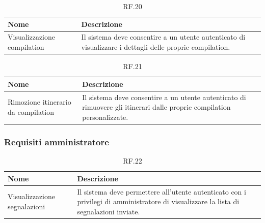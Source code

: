 \documentclass{natourDoc}
\begin{document}
\begin{table}[H]
	\centering
	\begin{tabular}{ |p{5cm}|p{10.3cm}| }
		\hline
		\rowcolor{PineGreen!70}
		\textbf{Nome}               & \textbf{Descrizione}                                                          \\
		\hline
		Visualizzazione compilation & Il sistema deve consentire a un utente autenticato di visualizzare i dettagli
		delle proprie compilation.                                                                                  \\
		\hline
	\end{tabular}
	\caption{RF.20}

\end{table}


\begin{table}[H]
	\centering
	\begin{tabular}{ |p{5cm}|p{10.3cm}| }
		\hline
		\rowcolor{PineGreen!70}
		\textbf{Nome}                       & \textbf{Descrizione}                                                          \\
		\hline
		Rimozione itinerario da compilation & Il sistema deve consentire a un utente autenticato di rimuovere gli itinerari
		dalle proprie compilation personalizzate.                                                                           \\
		\hline
	\end{tabular}
	\caption{RF.21}

\end{table}

\subsubsection{Requisiti amministratore}
\begin{table}[H]
	\centering
	\begin{tabular}{ |p{5cm}|p{10.3cm}| }
		\hline
		\rowcolor{PineGreen!70}
		\textbf{Nome}                & \textbf{Descrizione}                                                                                \\
		\hline
		Visualizzazione segnalazioni & Il sistema deve permettere all'utente autenticato con i privilegi di amministratore di visualizzare
		la lista di segnalazioni inviate.                                                                                                  \\
		\hline
	\end{tabular}
	\caption{RF.22}

\end{table}
\end{document}
